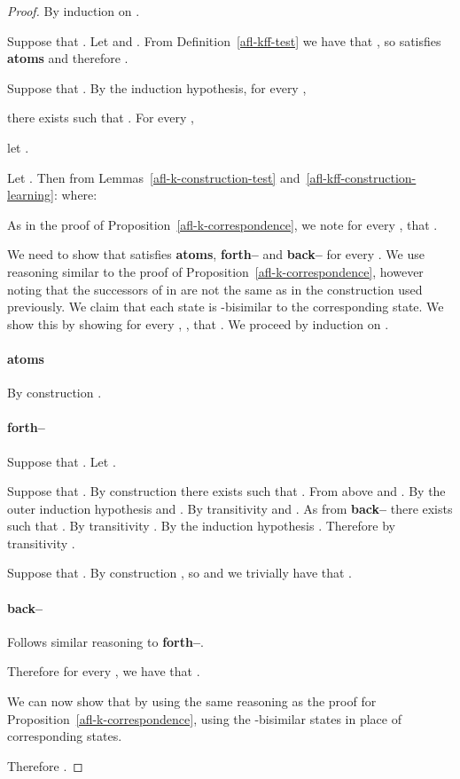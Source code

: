 \documentclass[twoside]{aiml14}
\begin{document}
  \begin{proof}
      By induction on .

      Suppose that . 
      Let  and
      . 
      From Definition~\ref{afl-kff-test} we have that
      , so
       satisfies 
      {\bf atoms} and therefore 
      .

      Suppose that . 
      By the induction hypothesis, for every , 
       
      there exists  such that 
      . 
      For every , 
       
      let .
      
      Let . 
      Then from Lemmas~\ref{afl-k-construction-test} and~\ref{afl-kff-construction-learning}:  where:
      

      As in the proof of Proposition~\ref{afl-k-correspondence}, 
      we note for every , 
       that
      .

      We need to show that  
      satisfies {\bf atoms}, {\bf forth--} and {\bf back--} 
      for every .
      We use reasoning similar to the proof of Proposition~\ref{afl-k-correspondence}, 
      however noting that the successors of  in
       are not the same as in the construction used
      previously.
      We claim that each 
      state is -bisimilar to the corresponding  state.
      We show this by showing for every , 
      ,
       that 
      .
      We proceed by induction on .

      \paragraph{atoms} By construction .

      \paragraph{forth--} Suppose that . Let . 
      
      Suppose that . 
      By construction there exists  
      such that .
      From above 
      and .
      By the outer induction hypothesis 
      and .
      By transitivity 
      and .
      As  from {\bf back--}
      there exists 
      such that .
      By transitivity .
      By the induction hypothesis .
      Therefore by transitivity .

      Suppose that . By construction
      ,
      so  
      and we trivially have that .

      \paragraph{back--} Follows similar reasoning to {\bf forth--}.

      Therefore for every , 
       we have that
      .

      We can now show that  
      by using the same reasoning as the proof for Proposition~\ref{afl-k-correspondence}, using the -bisimilar
       states 
      in place of corresponding  states.

      Therefore .
  \end{proof}
\end{document}
